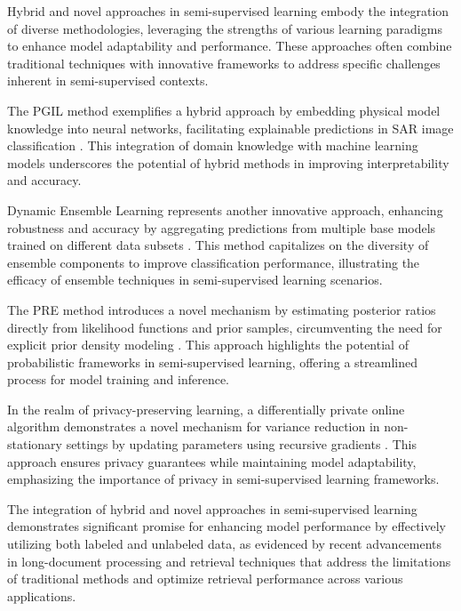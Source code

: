 Hybrid and novel approaches in semi-supervised learning embody the integration of diverse methodologies, leveraging the strengths of various learning paradigms to enhance model adaptability and performance. These approaches often combine traditional techniques with innovative frameworks to address specific challenges inherent in semi-supervised contexts.



The PGIL method exemplifies a hybrid approach by embedding physical model knowledge into neural networks, facilitating explainable predictions in SAR image classification \cite{huang2022physicallyexplainablecnnsar}. This integration of domain knowledge with machine learning models underscores the potential of hybrid methods in improving interpretability and accuracy.



Dynamic Ensemble Learning represents another innovative approach, enhancing robustness and accuracy by aggregating predictions from multiple base models trained on different data subsets \cite{ramasubramanian2009teachingresultanalysisusing}. This method capitalizes on the diversity of ensemble components to improve classification performance, illustrating the efficacy of ensemble techniques in semi-supervised learning scenarios.



The PRE method introduces a novel mechanism by estimating posterior ratios directly from likelihood functions and prior samples, circumventing the need for explicit prior density modeling \cite{liu2020posteriorratioestimationlatent}. This approach highlights the potential of probabilistic frameworks in semi-supervised learning, offering a streamlined process for model training and inference.



In the realm of privacy-preserving learning, a differentially private online algorithm demonstrates a novel mechanism for variance reduction in non-stationary settings by updating parameters using recursive gradients \cite{han2022privateonlineconvexoptimization}. This approach ensures privacy guarantees while maintaining model adaptability, emphasizing the importance of privacy in semi-supervised learning frameworks.



The integration of hybrid and novel approaches in semi-supervised learning demonstrates significant promise for enhancing model performance by effectively utilizing both labeled and unlabeled data, as evidenced by recent advancements in long-document processing and retrieval techniques that address the limitations of traditional methods and optimize retrieval performance across various applications. \cite{ginzburg2021selfsuperviseddocumentsimilarityranking,jang2024visualdeltageneratorlarge}

